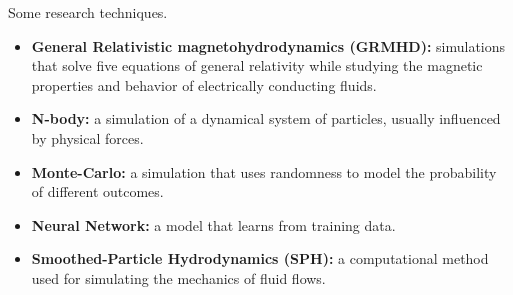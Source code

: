 \documentclass{exam}
\begin{document}
\begin{questions}
\end{questions}
Some research techniques.
\begin{itemize}
    \item \textbf{General Relativistic magnetohydrodynamics (GRMHD):} simulations that solve five equations of general relativity while studying the magnetic properties and behavior of electrically conducting fluids. 
    \item \textbf{N-body:} a simulation of a dynamical system of particles, usually influenced by physical forces.
    \item \textbf{Monte-Carlo:}  a simulation that uses randomness to model the probability of different outcomes.
    \item \textbf{Neural Network:} a model that learns from training data. 
    \item \textbf{Smoothed-Particle Hydrodynamics (SPH):} a computational method used for simulating the mechanics of fluid flows.
\end{itemize}
\end{document}

